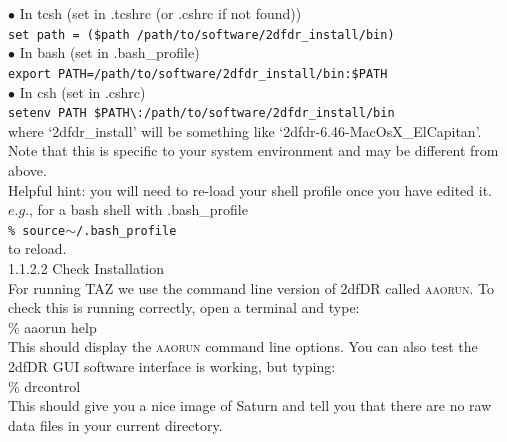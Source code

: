 \documentclass[12pt]{article}
\begin{document}
    $\bullet$ In tcsh (set in .tcshrc (or .cshrc if not found)) \\
   \hspace{10mm} \texttt{set path = (\$path /path/to/software/2dfdr\_install/bin)}\\

     $\bullet$ In bash (set in .bash\_profile) \\
    \hspace{10mm} \texttt{export PATH=/path/to/software/2dfdr\_install/bin:\$PATH}\\

     $\bullet$ In csh (set in .cshrc)\\
    \hspace{10mm} \texttt{setenv PATH \$PATH\textbackslash:/path/to/software/2dfdr\_install/bin}\\


where `2dfdr\_install' will be something like `2dfdr-6.46-MacOsX\_ElCapitan'. Note that this is specific to your system environment and may be different from above. \\

Helpful hint: you will need to re-load your shell profile once you have edited it. $e.g.$, for a bash shell with .bash\_profile \\ 

 \hspace{10mm} \texttt{\% source$\sim$/.bash\_profile}\\

to reload. \\

\textsf{1.1.2.2 Check Installation} \\

For running \textsc{TAZ} we use the command line version of 2dfDR called \textsc{aaorun}. To check this is running correctly, open a terminal and type: \\

\hspace{10mm} \% aaorun help\\

This should display the  \textsc{aaorun} command line options. You can also test the 2dfDR GUI software interface is working, but typing: \\

 
\hspace{10mm} \% drcontrol\\

This should give you a nice image of Saturn and tell you that there are no raw data files in your current directory.
\end{document}
